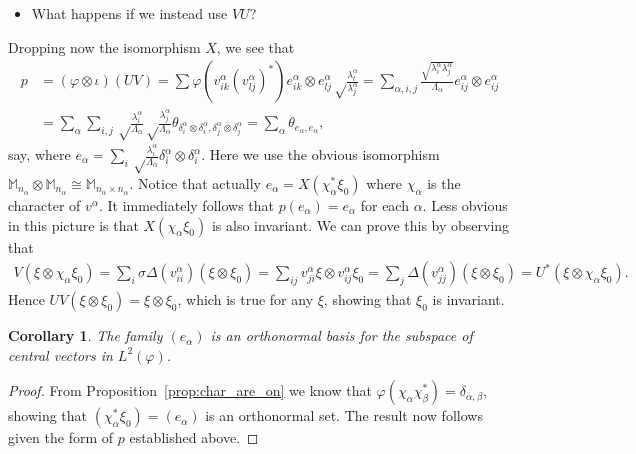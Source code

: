 \documentclass[twoside,a4paper,12pt]{article}
\theoremstyle{plain}
\newtheorem{corollary}[proposition]{Corollary}
\theoremstyle{definition}
\begin{document}
\begin{itemize}
\item What happens if we instead use $VU$?
\end{itemize}

Dropping now the isomorphism $X$, we see that
\begin{align*} p &= (\varphi\otimes\iota)(UV) = \sum \varphi(v^\alpha_{ik}
(v^\alpha_{lj})^*) e^\alpha_{ik} \otimes e^\alpha_{lj}
\sqrt\frac{\lambda^\alpha_l}{\lambda^\alpha_j}
= \sum_{\alpha,i,j}
\frac{\sqrt{\lambda^\alpha_i \lambda^\alpha_j}}{\Lambda_\alpha}
e^\alpha_{ij} \otimes e^\alpha_{ij} \\
&= \sum_\alpha \sum_{i,j} \sqrt\frac{\lambda^\alpha_i}{\Lambda_\alpha}
\sqrt\frac{\lambda^\alpha_j}{\Lambda_\alpha}
\theta_{\delta^\alpha_i\otimes\delta^\alpha_i,
\delta^\alpha_j\otimes\delta^\alpha_j}
= \sum_\alpha \theta_{e_\alpha,e_\alpha},
\end{align*}
say, where $e_\alpha = \sum_i \sqrt\frac{\lambda^\alpha_i}{\Lambda_\alpha}
\delta^\alpha_i\otimes\delta^\alpha_i$.  Here we use the obvious isomorphism
$\mathbb M_{n_\alpha} \otimes \mathbb M_{n_\alpha}
\cong \mathbb M_{n_\alpha\times n_\alpha}$.  Notice that actually
$e_\alpha = X(\chi_\alpha^*\xi_0)$ where $\chi_\alpha$ is the character
of $v^\alpha$.  It immediately follows that $p(e_\alpha) = e_\alpha$ for
each $\alpha$.  Less obvious in this picture is that $X(\chi_\alpha\xi_0)$ is
also invariant.  We can prove this by observing that
\begin{align*} V(\xi\otimes\chi_\alpha\xi_0)
= \sum_i \sigma\Delta(v^\alpha_{ii}) (\xi\otimes\xi_0)
= \sum_{ij} v^\alpha_{ji}\xi \otimes v^\alpha_{ij}\xi_0
= \sum_j \Delta(v^\alpha_{jj})(\xi \otimes \xi_0)
= U^*(\xi\otimes\chi_\alpha\xi_0).
\end{align*}
Hence $UV(\xi\otimes\xi_0) = \xi\otimes\xi_0$, which is true for any $\xi$,
showing that $\xi_0$ is invariant.

\begin{corollary}
The family $(e_\alpha)$ is an orthonormal basis for the subspace of
central vectors in $L^2(\varphi)$.
\end{corollary}
\begin{proof}
From Proposition~\ref{prop:char_are_on} we know that $\varphi(\chi_\alpha
\chi_\beta^*) = \delta_{\alpha,\beta}$, showing that $(\chi_\alpha^*\xi_0)
= (e_\alpha)$ is an orthonormal set.  The result now follows given the
form of $p$ established above.
\end{proof}
\end{document}
